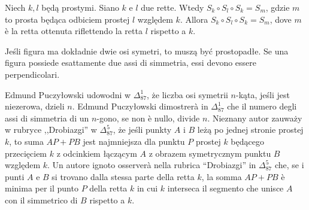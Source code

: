 \begin{proposition}
\label{klkm1}%
    Niech $k, l$ będą prostymi. %
    Siano $k$ e $l$ due rette. %
    Wtedy $S_k \circ S_l \circ S_k = S_m$, gdzie $m$ to prosta będąca odbiciem prostej $l$ względem $k$. %
    Allora $S_k \circ S_l \circ S_k = S_m$, dove $m$ è la retta ottenuta riflettendo la retta $l$ rispetto a $k$. %
\end{proposition}

Jeśli figura ma dokładnie dwie osi symetri, to muszą być prostopadłe. %
Se una figura possiede esattamente due assi di simmetria, essi devono essere perpendicolari. %

Edmund Puczyłowski udowodni w $\Delta_{87}^{1}$, że liczba osi symetrii $n$-kąta, jeśli jest niezerowa, dzieli $n$. %
Edmund Puczyłowski dimostrerà in $\Delta_{87}^{1}$ che il numero degli assi di simmetria di un $n$-gono, se non è nullo, divide $n$. %
Nieznany autor zauważy w rubryce ,,Drobiazgi'' w $\Delta_{87}^{5}$, że jeśli punkty $A$ i $B$ leżą po jednej stronie prostej $k$, to suma $AP + PB$ jest najmniejsza dla punktu $P$ prostej $k$ będącego przecięciem $k$ z odcinkiem łączącym $A$ z obrazem symetrycznym punktu $B$ względem $k$. %
Un autore ignoto osserverà nella rubrica ``Drobiazgi'' in $\Delta_{87}^{5}$ che, se i punti $A$ e $B$ si trovano dalla stessa parte della retta $k$, la somma $AP+PB$ è minima per il punto $P$ della retta $k$ in cui $k$ interseca il segmento che unisce $A$ con il simmetrico di $B$ rispetto a $k$. %

%